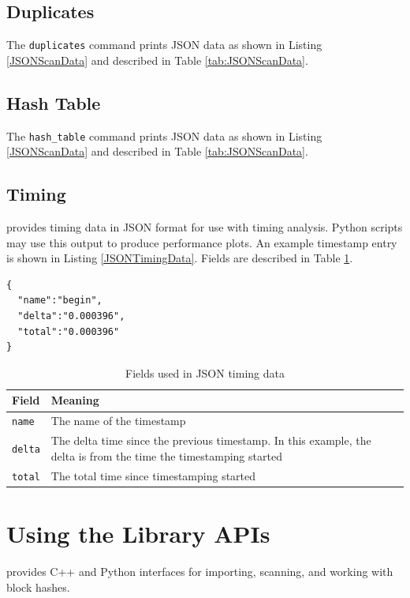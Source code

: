 \documentclass[11pt,fleqn]{article} %
\begin{document}
\subsection{Duplicates}
The \verb+duplicates+ command prints JSON data as shown in Listing \ref{JSONScanData} and described in Table \ref{tab:JSONScanData}.\\

\subsection{Hash Table}
The \verb+hash_table+ command prints JSON data as shown in Listing \ref{JSONScanData} and described in Table \ref{tab:JSONScanData}.\\

\subsection{Timing}
\hdb provides timing data in JSON format for use with timing analysis. Python scripts may use this output to produce performance plots. An example timestamp entry is shown in Listing \ref{JSONTimingData}. Fields are described in Table \ref{tab:JSONTimingData}.\\

\lstset{style=customfile}
\begin{lstlisting}[caption={Example JSON timestamp format}, label=JSONTimingData]
{
  "name":"begin",
  "delta":"0.000396",
  "total":"0.000396"
}
\end{lstlisting}

\begin{table}[!ht]

\centering
\caption{Fields used in JSON timing data}
\label{tab:JSONTimingData}
\begin{tabular}{|p{5 cm}|p{8.8 cm}|}
\hline \hline
\textbf{Field} & \textbf{Meaning} \\
\hline
\verb+name+ & The name of the timestamp\\
\hline
\verb+delta+ & The delta time since the previous timestamp. In this example, the delta is from the time the timestamping started\\
\hline
\verb+total+ & The total time since timestamping started\\
\hline
\end{tabular}
\end{table}



\section{Using the \hdb Library APIs}
\label{APIs}
\hdb provides C++ and Python interfaces for importing, scanning, and working with block hashes.
\end{document}
